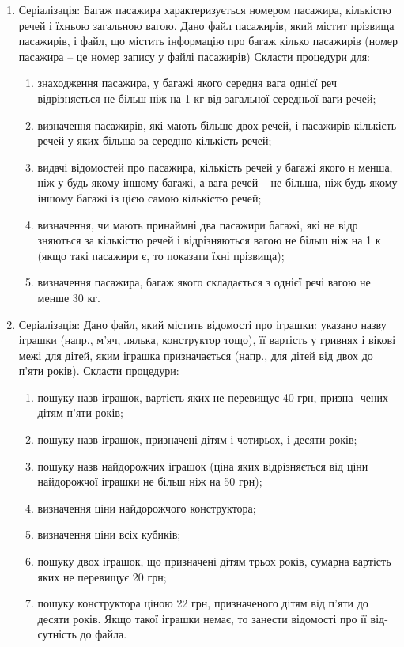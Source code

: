 \documentclass[]{article}
\makeatletter
\newcommand{\xslalph}[1]{\expandafter\@xslalph\csname c@#1\endcsname}
\newcommand{\@xslalph}[1]{%
    \ifcase#1\or а\or б\or в\or г\or д\or e\or є\or ж\or з\or i%
    \or й\or к\or л\or м\or н\or о\or п\or р\or с\or т%
    \or у\or ф\or х\or ц\or ч\or ш\or ю\or я\or аа\or бб\or вв %
    \else\@ctrerr\fi%
}
\makeatother
\begin{document}
\begin{enumerate}
\def\labelenumi{\arabic{enumi}.}

\item  Серіалізація: Багаж пасажира характеризується номером пасажира, кількістю
речей  і  їхньою  загальною  вагою.  Дано  файл  пасажирів,  який  містит
прізвища пасажирів,  і файл, що містить  інформацію  про  багаж  кілько
пасажирів (номер  пасажира –  це  номер  запису  у  файлі  пасажирів)
Скласти процедури для: 
\begin{enumerate}[label=\xslalph*)]
\item  знаходження  пасажира,  у  багажі  якого  середня  вага  однієї  реч
відрізняється не більш ніж на 1 кг від загальної середньої ваги речей; 
\item визначення пасажирів, які мають більше двох речей,  і пасажирів
кількість речей у яких більша за середню кількість речей; 
\item видачі відомостей про пасажира, кількість речей у багажі якого н
менша, ніж у будь-якому іншому багажі, а вага речей – не більша, ніж 
будь-якому іншому багажі із цією самою кількістю речей; 
\item визначення, чи мають принаймні два пасажири багажі, які не відр
зняються за кількістю речей  і відрізняються вагою не більш ніж на 1 к
(якщо такі пасажири є, то показати їхні прізвища); 
\item визначення пасажира, багаж якого складається з однієї речі вагою
не менше 30 кг.
\end{enumerate}
\item  Серіалізація: Дано файл,  який містить  відомості  про  іграшки:  указано  назву 
іграшки (напр., м'яч,  лялька,  конструктор  тощо),  її  вартість  у  гривнях  і 
вікові межі для дітей, яким  іграшка призначається (напр., для дітей від 
двох до п'яти років). Скласти процедури: 
\begin{enumerate}[label=\xslalph*)]
\item пошуку назв  іграшок, вартість яких не перевищує 40 грн, призна-
чених дітям п'яти років; 
\item пошуку назв іграшок, призначені дітям і чотирьох, і десяти років; 
\item пошуку назв найдорожчих іграшок (ціна яких відрізняється від ціни 
найдорожчої іграшки не більш ніж на 50 грн); 
\item визначення ціни найдорожчого конструктора; 
\item визначення ціни всіх кубиків; 
\item пошуку  двох  іграшок,  що  призначені  дітям  трьох  років,  сумарна 
вартість яких не перевищує 20 грн; 
\item пошуку конструктора ціною 22 грн, призначеного дітям від п'яти до 
десяти років. Якщо такої іграшки немає, то занести відомості про  її від-
сутність до файла. 
\end{enumerate}


\end{enumerate}
\end{document}
